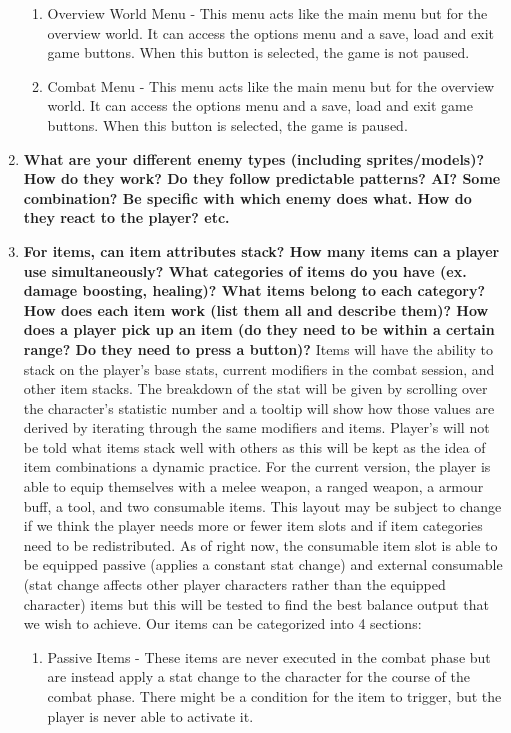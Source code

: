 \documentclass[12pt, titlepage]{article}
\begin{document}
\begin{enumerate}
\begin{enumerate}
	\item Overview World Menu - This menu acts like the main menu but for the overview world. It can access the options menu and a save, load and exit game buttons. When this button is selected, the game is not paused.
	\item Combat Menu - This menu acts like the main menu but for the overview world. It can access the options menu and a save, load and exit game buttons. When this button is selected, the game is paused.
	\end{enumerate}
	\item \textbf{What are your different enemy types (including sprites/models)? How do they work? Do they follow predictable patterns? AI? Some combination? Be specific with which enemy does what. How do they react to the player? etc.}
	\item \textbf{For items, can item attributes stack? How many items can a player use simultaneously? What categories of items do you have (ex. damage boosting, healing)? What items belong to each category? How does each item work (list them all and describe them)? How does a player pick up an item (do they need to be within a certain range? Do they need to press a button)?}
	Items will have the ability to stack on the player's base stats, current modifiers in the combat session, and other item stacks. The breakdown of the stat will be given by scrolling over the character's statistic number and a tooltip will show how those values are derived by iterating through the same modifiers and items. Player's will not be told what items stack well with others as this will be kept as the idea of item combinations a dynamic practice.
	For the current version, the player is able to equip themselves with a melee weapon, a ranged weapon, a armour buff, a tool, and two consumable items. This layout may be subject to change if we think the player needs more or fewer item slots and if item categories need to be redistributed. As of right now, the consumable item slot is able to be equipped passive (applies a constant stat change) and external consumable (stat change affects other player characters rather than the equipped character) items but this will be tested to find the best balance output that we wish to achieve.
	Our items can be categorized into 4 sections:
	\begin{enumerate}
	\item Passive Items - These items are never executed in the combat phase but are instead apply a stat change to the character for the course of the combat phase. There might be a condition for the item to trigger, but the player is never able to activate it.

\end{enumerate}
\end{enumerate}
\end{document}
